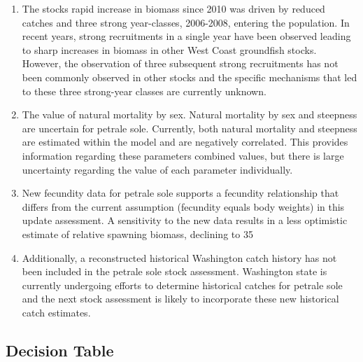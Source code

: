 \documentclass[12pt,]{article}
\begin{document}
\begin{enumerate}

\item The stocks rapid increase in biomass since 2010 was driven by reduced catches and three strong year-classes, 2006-2008, entering the population.  In recent years, strong recruitments in a single year have been observed leading to sharp increases in biomass in other West Coast groundfish stocks. However, the observation of three subsequent strong recruitments has not been commonly observed in other stocks and the specific mechanisms that led to these three strong-year classes are currently unknown. 

\item The value of natural mortality by sex.    Natural mortality by sex and steepness are uncertain for petrale sole.  Currently, both natural mortality and steepness are estimated within the model and are negatively correlated.  This provides information regarding these parameters combined values, but there is large uncertainty regarding the value of each parameter individually.

\item New fecundity data for petrale sole supports a fecundity relationship that differs from the current assumption (fecundity equals body weights) in this update assessment. A sensitivity to the new data results in a less optimistic estimate of relative spawning biomass, declining to 35%

\item Additionally, a reconstructed historical Washington catch history has not been included in the petrale sole stock assessment.  Washington state is currently undergoing efforts to determine historical catches for petrale sole and the next stock assessment is likely to incorporate these new historical catch estimates. 

\end{enumerate}

\subsection*{Decision Table}\label{decision-table}
\end{document}
